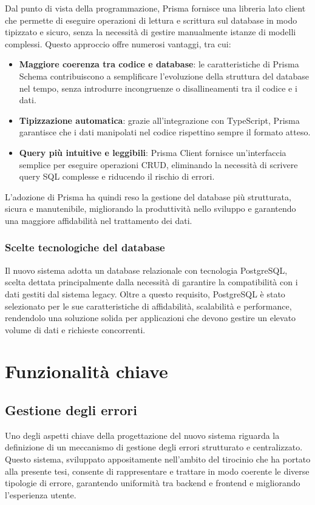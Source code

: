 Dal punto di vista della programmazione, Prisma fornisce una libreria lato client che permette di eseguire operazioni di lettura e scrittura sul database in modo tipizzato e sicuro, senza la necessità di gestire manualmente istanze di modelli complessi. Questo approccio offre numerosi vantaggi, tra cui:
\begin{itemize}
  \item \textbf{Maggiore coerenza tra codice e database}: le caratteristiche di Prisma Schema contribuiscono a semplificare l'evoluzione della struttura del database nel tempo, senza introdurre incongruenze o disallineamenti tra il codice e i dati.
  \item \textbf{Tipizzazione automatica}: grazie all’integrazione con TypeScript, Prisma garantisce che i dati manipolati nel codice rispettino sempre il formato atteso.
  \item \textbf{Query più intuitive e leggibili}: Prisma Client fornisce un'interfaccia semplice per eseguire operazioni CRUD, eliminando la necessità di scrivere query SQL complesse e riducendo il rischio di errori.
\end{itemize}
L'adozione di Prisma ha quindi reso la gestione del database più strutturata, sicura e manutenibile, migliorando la produttività nello sviluppo e garantendo una maggiore affidabilità nel trattamento dei dati.

\subsubsection{Scelte tecnologiche del database}
Il nuovo sistema adotta un database relazionale con tecnologia PostgreSQL, scelta dettata principalmente dalla necessità di garantire la compatibilità con i dati gestiti dal sistema legacy. Oltre a questo requisito, PostgreSQL è stato selezionato per le sue caratteristiche di affidabilità, scalabilità e performance, rendendolo una soluzione solida per applicazioni che devono gestire un elevato volume di dati e richieste concorrenti.

\section{Funzionalità chiave}
\subsection{Gestione degli errori}
Uno degli aspetti chiave della progettazione del nuovo sistema riguarda la definizione di un meccanismo di gestione degli errori strutturato e centralizzato. Questo sistema, sviluppato appositamente nell’ambito del tirocinio che ha portato alla presente tesi, consente di rappresentare e trattare in modo coerente le diverse tipologie di errore, garantendo uniformità tra backend e frontend e migliorando l’esperienza utente.

